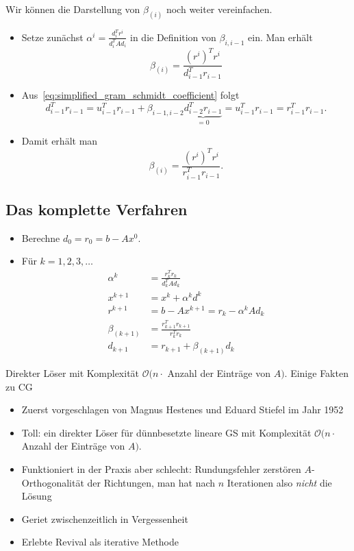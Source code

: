 Wir können die Darstellung von $\beta_{(i)}$ noch weiter vereinfachen.
\begin{itemize}
 \item Setze zunächst $\alpha^i=\frac{d_i^Tr^i}{d_i^TAd_i}$ in die Definition von $\beta_{i,i-1}$ ein.
  Man erhält
  \begin{equation*}
   \beta_{(i)}=\frac{(r^i)^Tr^i}{d_{i-1}^Tr_{i-1}}
  \end{equation*}
 \item Aus~\eqref{eq:simplified_gram_schmidt_coefficient} folgt
 \begin{equation*}
  d^T_{i-1}r_{i-1}
  =
  u^T_{i-1} r_{i-1} + \beta_{i-1,i-2} \underbrace{d^T_{i-2}r_{i-1}}_{=0}
  =
  u^T_{i-1} r_{i-1}
  =
  r^T_{i-1} r_{i-1}.
 \end{equation*}
 \item Damit erhält man
  \begin{equation*}
   \beta_{(i)} = \frac{(r^i)^Tr^i}{r_{i-1}^Tr_{i-1}}.
  \end{equation*}

\end{itemize}



\subsection{Das komplette Verfahren}
\begin{itemize}
 \item Berechne $d_0=r_0=b-Ax^0$.
 \item Für $k=1,2,3,\ldots$
   \begin{align*}
    \alpha^k & =\frac{r_k^Tr_k}{d_k^TAd_k} \\
    x^{k+1} & =x^k+\alpha^kd^k \\
    r^{k+1} & =b-Ax^{k+1}=r_k-\alpha^kAd_k \\
    \beta_{(k+1)} & =\frac{r_{k+1}^Tr_{k+1}}{r_k^Tr_k} \\
    d_{k+1} & =r_{k+1}+\beta_{(k+1)}d_k
   \end{align*}
\end{itemize}
Direkter Löser mit Komplexität $\mathcal{O}(n \cdot$ Anzahl der Einträge von $A)$. Einige Fakten zu CG \begin{itemize}
	\item Zuerst vorgeschlagen von Magnus Hestenes und Eduard Stiefel im Jahr 1952
	\item Toll: ein direkter Löser für dünnbesetzte lineare GS mit Komplexität $\mathcal{O}(n \cdot$ Anzahl der Einträge von $A)$.
	\item Funktioniert in der Praxis aber schlecht: Rundungsfehler zerstören $A$-Orthogonalität der Richtungen, man hat nach $n$ Iterationen also \emph{nicht} die Lösung
	\item Geriet zwischenzeitlich in Vergessenheit
	\item Erlebte Revival als iterative Methode
\end{itemize}

